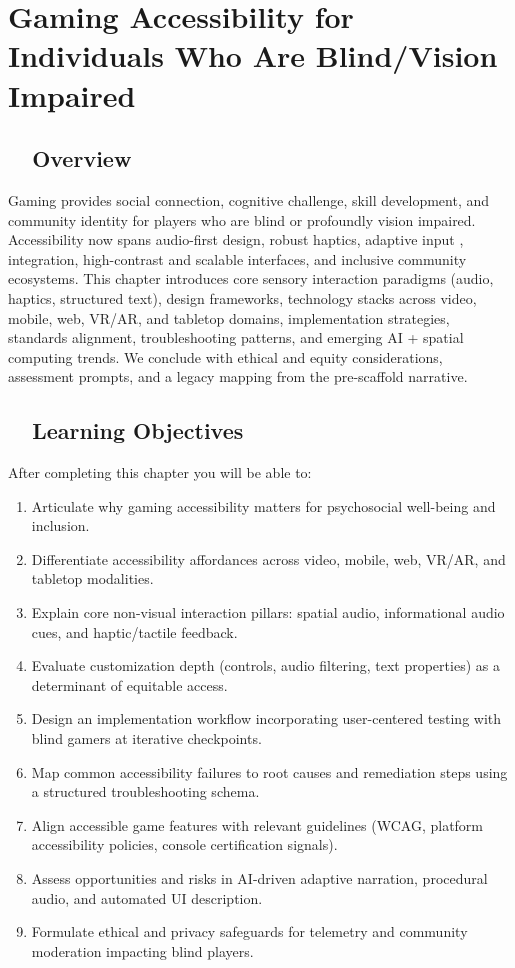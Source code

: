 \chapter{Gaming Accessibility for Individuals Who Are Blind/Vision Impaired}
\label{chap:gaming-accessibility}

\section{~~Overview}
\label{sec:gaming-overview}
Gaming provides social connection, cognitive challenge, skill development, and community identity for players who are blind or profoundly vision impaired. Accessibility now spans audio-first design, robust haptics, adaptive input ,  integration, high-contrast and scalable interfaces, and inclusive community ecosystems\supercite{AbleGamers2025}. This chapter introduces core sensory interaction paradigms (audio, haptics, structured text), design frameworks, technology stacks across video, mobile, web, VR/AR, and tabletop domains, implementation strategies, standards alignment, troubleshooting patterns, and emerging AI + spatial computing trends. We conclude with ethical and equity considerations, assessment prompts, and a legacy mapping from the pre-scaffold narrative.

\section{~~Learning Objectives}
\label{sec:gaming-learning-objectives}
After completing this chapter you will be able to:
\begin{enumerate}
	\item Articulate why gaming accessibility matters for psychosocial well-being and inclusion.
	\item Differentiate accessibility affordances across video, mobile, web, VR/AR, and tabletop modalities.
	\item Explain core non-visual interaction pillars: spatial audio, informational audio cues, and haptic/tactile feedback.
	\item Evaluate customization depth (controls, audio filtering, text properties) as a determinant of equitable access.
	\item Design an implementation workflow incorporating user-centered testing with blind gamers at iterative checkpoints.
	\item Map common accessibility failures to root causes and remediation steps using a structured troubleshooting schema.
	\item Align accessible game features with relevant guidelines (WCAG, platform accessibility policies, console certification signals).
	\item Assess opportunities and risks in AI-driven adaptive narration, procedural audio, and automated UI description.
	\item Formulate ethical and privacy safeguards for telemetry and community moderation impacting blind players.
\end{enumerate}

